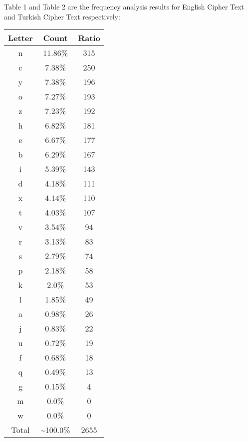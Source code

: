 \documentclass[12pt,a4paper, margin=1in]{article}
\begin{document}
\begin{enumerate}
\begin{enumerate}
            Table 1 and Table 2 are the frequency analysis results for English Cipher Text and Turkish Cipher Text respectively:\\
            \begin{table}[!h]
            \centering
                \begin{tabular}{||c c c||} 
                 \hline
                 Letter & Count & Ratio \\ [0.5ex] 
                 \hline\hline
                 n & 11.86\% & 315 \\ 
                 \hline
                 c & 7.38\% & 250 \\
                 \hline
                 y & 7.38\% & 196 \\
                 \hline
                 o & 7.27\% & 193 \\
                 \hline
                 z & 7.23\% & 192 \\ 
                 \hline
                 h & 6.82\% & 181 \\
                 \hline
                 e & 6.67\% & 177 \\
                 \hline
                 b & 6.29\% & 167 \\
                 \hline
                 i & 5.39\% & 143 \\
                 \hline
                 d & 4.18\% & 111 \\
                 \hline
                 x & 4.14\% & 110 \\
                 \hline
                 t & 4.03\% & 107 \\
                 \hline
                 v & 3.54\% & 94 \\
                 \hline
                 r & 3.13\% & 83 \\
                 \hline
                 s & 2.79\% & 74 \\
                 \hline
                 p & 2.18\% & 58 \\
                 \hline
                 k & 2.0\% & 53 \\
                 \hline
                 l & 1.85\% & 49 \\
                 \hline
                 a & 0.98\% & 26 \\
                 \hline
                 j & 0.83\% & 22 \\
                 \hline
                 u & 0.72\% & 19 \\
                 \hline
                 f & 0.68\% & 18 \\
                 \hline
                 q & 0.49\% & 13 \\
                 \hline
                 g & 0.15\% & 4 \\
                 \hline
                 m & 0.0\% & 0 \\
                 \hline
                 w & 0.0\% & 0 \\
                 \hline
                 Total & \textasciitilde100.0\% & 2655 \\
                 \hline
                 

\end{tabular}
\end{table}
\end{enumerate}
\end{enumerate}
\end{document}
